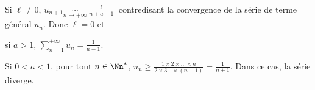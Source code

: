 {{\begin{enumerate}
Si $\ell\neq0$, $u_{n+1}\underset{n\rightarrow+\infty}{\sim}\frac{\ell}{n+a+1}$ contredisant la convergence de la série de terme général $u_n$. Donc $\ell= 0$ et

\begin{center}
si $a > 1$,  $\sum_{n=1}^{+\infty}u_n=\frac{1}{a-1}$.
\end{center}

Si $0<a<1$, pour tout $n\in\Nn^*$, $u_n\geqslant\frac{1\times2\times\ldots\times n}{2\times3\ldots\times(n+1)}=\frac{1}{n+1}$. Dans ce cas, la série diverge.
\end{enumerate}}
}